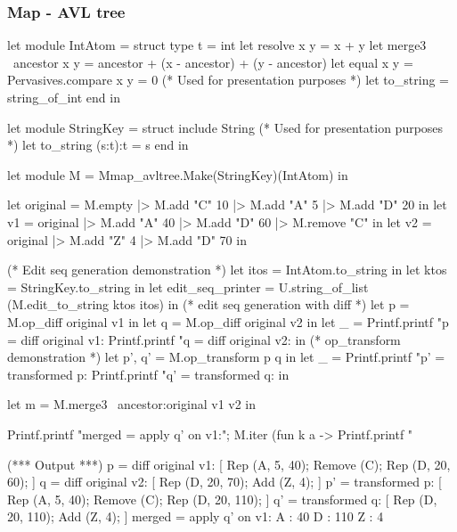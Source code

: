 \documentclass{article}
\begin{document}
\subsubsection{Map - AVL tree}
\begin{longlisting}
let module IntAtom = struct
  type t = int
  let resolve x y = x + y
  let merge3 ~ancestor x y = ancestor + (x - ancestor) + (y - ancestor)
  let equal x y = Pervasives.compare x y = 0 
  (* Used for presentation purposes *)
  let to_string = string_of_int
end in

let module StringKey = struct
  include String
  (* Used for presentation purposes *)
  let to_string (s:t):t = s
end in

let module M = Mmap_avltree.Make(StringKey)(IntAtom) in

let original = M.empty |> M.add "C" 10 |> M.add "A" 5 |> M.add "D" 20 in
let v1 = original |> M.add "A" 40 |> M.add "D" 60 |> M.remove "C" in
let v2 = original |> M.add "Z" 4 |> M.add "D" 70 in

(* Edit seq generation demonstration *)
let itos = IntAtom.to_string in
let ktos = StringKey.to_string in 
let edit_seq_printer = U.string_of_list (M.edit_to_string ktos itos) in
(* edit seq generation with diff *)
let p = M.op_diff original v1 in
let q = M.op_diff original v2 in
let _ = 
  Printf.printf "p = diff original v1: %
  Printf.printf "q = diff original v2: %
in
(* op_transform demonstration *)
let p', q' = M.op_transform p q in
let _ = 
  Printf.printf "p' = transformed p: %
  Printf.printf "q' = transformed q: %
in

let m = M.merge3 ~ancestor:original v1 v2 in

Printf.printf "merged = apply q' on v1:\n";
M.iter (fun k a -> Printf.printf "%

(*** Output ***)
p = diff original v1: [ Rep (A, 5, 40); Remove (C); Rep (D, 20, 60); ]
q = diff original v2: [ Rep (D, 20, 70); Add (Z, 4); ]
p' = transformed p: [ Rep (A, 5, 40); Remove (C); Rep (D, 20, 110); ]
q' = transformed q: [ Rep (D, 20, 110); Add (Z, 4); ]
merged = apply q' on v1:
A : 40
D : 110
Z : 4
\end{longlisting}
\end{document}
